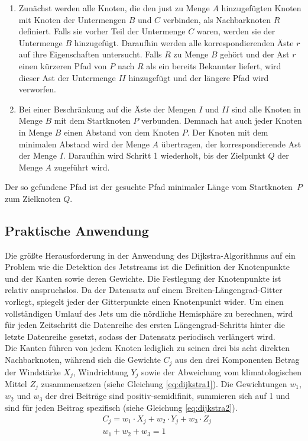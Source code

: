 \begin{enumerate}
  \item Zunächst werden alle Knoten, die den just zu Menge $A$ hinzugefügten Knoten mit Knoten der Untermengen $B$ und $C$ verbinden, als Nachbarknoten $R$ definiert. Falls sie vorher Teil der Untermenge $C$ waren, werden sie der Untermenge $B$ hinzugefügt. Daraufhin werden alle korrespondierenden Äste $r$ auf ihre Eigenschaften untersucht. Falls $R$ zu Menge $B$ gehört und der Ast $r$ einen kürzeren Pfad von $P$ nach $R$ als ein bereits Bekannter liefert, wird dieser Ast der Untermenge $II$ hinzugefügt und der längere Pfad wird verworfen. 
  \item Bei einer Beschränkung auf die Äste der Mengen $I$ und $II$ sind alle Knoten in Menge $B$ mit dem Startknoten $P$ verbunden. Demnach hat auch jeder Knoten in Menge $B$ einen Abstand von dem Knoten $P$. Der Knoten mit dem minimalen Abstand wird der Menge $A$ übertragen, der korrespondierende Ast der Menge $I$. Daraufhin wird Schritt 1 wiederholt, bis der Zielpunkt $Q$ der Menge $A$ zugeführt wird. 
\end{enumerate}
Der so gefundene Pfad ist der gesuchte Pfad minimaler Länge vom Startknoten~$P$ zum Zielknoten $Q$. \citep{dijkstra-1959}
\subsection{Praktische Anwendung}
Die größte Herausforderung in der Anwendung des Dijkstra-Algorithmus auf ein Problem wie die Detektion des Jetstreams ist die Definition der Knotenpunkte und der Kanten sowie deren Gewichte. Die Festlegung der Knotenpunkte ist relativ anspruchslos. Da der Datensatz auf einem Breiten-Längengrad-Gitter vorliegt, spiegelt jeder der Gitterpunkte einen Knotenpunkt wider. Um einen vollständigen Umlauf des Jets um die nördliche Hemisphäre zu berechnen, wird für jeden Zeitschritt die Datenreihe des ersten Längengrad-Schritts hinter die letzte Datenreihe gesetzt, sodass der Datensatz periodisch verlängert wird.
\\
Die Kanten führen von jedem Knoten lediglich zu seinen drei bis acht direkten Nachbarknoten, während sich die Gewichte $C_j$ aus den drei Komponenten Betrag der Windstärke $X_j$, Windrichtung $Y_j$ sowie der Abweichung vom klimatologischen Mittel $Z_j$ zusammensetzen (siehe Gleichung \ref{eq:dijkstra1}). Die Gewichtungen $w_1$, $w_2$ und $w_3$ der drei Beiträge sind positiv-semidifinit, summieren sich auf 1 und sind für jeden Beitrag spezifisch (siehe Gleichung \ref{eq:dijkstra2}).
\begin{align}
  & C_j = w_1 \cdot X_j + w_2 \cdot Y_j + w_3 \cdot Z_j   
  \label{eq:dijkstra1}\\
  & w_1 + w_2 + w_3 = 1
  \label{eq:dijkstra2}
\end{align} 

